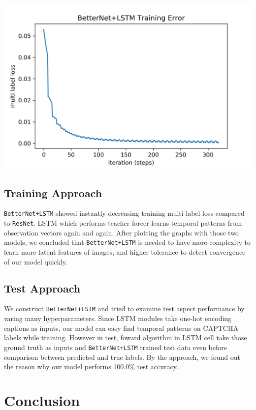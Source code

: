 \documentclass[10pt,twocolumn, letterpaper]{article}
\begin{document}
\begin{center}
\includegraphics[width=1\linewidth]{./BetterNet+LSTM.png}
\end{center}

\subsection{Training Approach}
\texttt{BetterNet+LSTM} showed instantly decreasing training multi-label loss compared to \texttt{ResNet}. LSTM which performs teacher forcer learns temporal patterns from observation vectors again and again. After plotting the graphs with those two models, we concluded that \texttt{BetterNet+LSTM} is needed to have more complexity to learn more latent features of images, and higher tolerance to detect convergence of our model quickly.

\subsection{Test Approach}
We construct \texttt{BetterNet+LSTM} and tried to examine test aspect performance by varing many hyperparameters. Since LSTM modules take one-hot encoding captions as inputs, our model can easy find temporal patterns on CAPTCHA labels while training. However in test, foward algorithm in LSTM cell take those ground truth as inputs and \texttt{BetterNet+LSTM} trained test data even before comparison between predicted and true labels. By the approach, we found out the reason why our model performs 100.0\% test accuracy.

\section{Conclusion}
\end{document}
